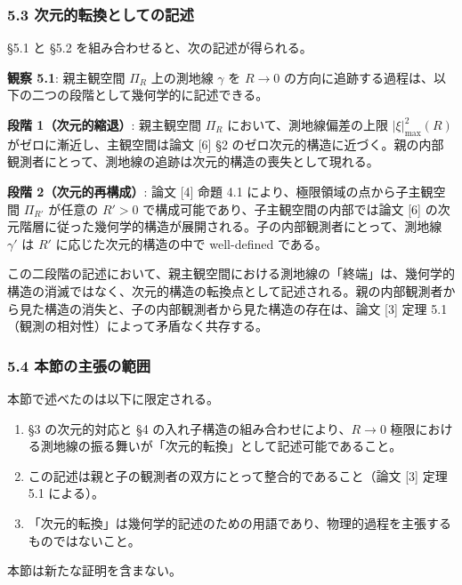 \documentclass[a4paper,11pt]{ltjsarticle}
\theoremstyle{definition}
\providecommand{\tightlist}{\setlength{\itemsep}{0pt}\setlength{\parskip}{0pt}}
\begin{document}
\subsubsection{5.3
次元的転換としての記述}\label{ux6b21ux5143ux7684ux8ee2ux63dbux3068ux3057ux3066ux306eux8a18ux8ff0}

§5.1 と §5.2 を組み合わせると、次の記述が得られる。

\textbf{観察 5.1}: 親主観空間 \(\Pi_R\) 上の測地線 \(\gamma\) を
\(R \to 0\)
の方向に追跡する過程は、以下の二つの段階として幾何学的に記述できる。

\textbf{段階 1（次元的縮退）}: 親主観空間 \(\Pi_R\)
において、測地線偏差の上限 \(|\xi|^2_{\max}(R)\)
がゼロに漸近し、主観空間は論文 {[}6{]} §2
のゼロ次元的構造に近づく。親の内部観測者にとって、測地線の追跡は次元的構造の喪失として現れる。

\textbf{段階 2（次元的再構成）}: 論文 {[}4{]} 命題 4.1
により、極限領域の点から子主観空間 \(\Pi_{R'}\) が任意の \(R' > 0\)
で構成可能であり、子主観空間の内部では論文 {[}6{]}
の次元階層に従った幾何学的構造が展開される。子の内部観測者にとって、測地線
\(\gamma'\) は \(R'\) に応じた次元的構造の中で well-defined である。

この二段階の記述において、親主観空間における測地線の「終端」は、幾何学的構造の消滅ではなく、次元的構造の転換点として記述される。親の内部観測者から見た構造の消失と、子の内部観測者から見た構造の存在は、論文
{[}3{]} 定理 5.1（観測の相対性）によって矛盾なく共存する。

\subsubsection{5.4
本節の主張の範囲}\label{ux672cux7bc0ux306eux4e3bux5f35ux306eux7bc4ux56f2-1}

本節で述べたのは以下に限定される。

\begin{enumerate}
\def\labelenumi{\arabic{enumi}.}
\tightlist
\item
  §3 の次元的対応と §4 の入れ子構造の組み合わせにより、\(R \to 0\)
  極限における測地線の振る舞いが「次元的転換」として記述可能であること。
\item
  この記述は親と子の観測者の双方にとって整合的であること（論文 {[}3{]}
  定理 5.1 による）。
\item
  「次元的転換」は幾何学的記述のための用語であり、物理的過程を主張するものではないこと。
\end{enumerate}

本節は新たな証明を含まない。
\end{document}
